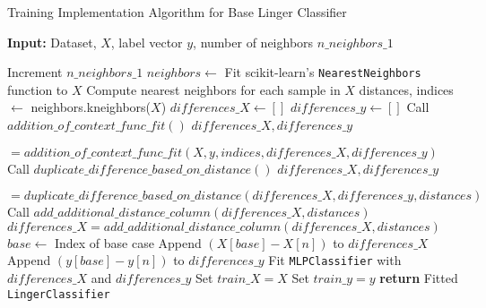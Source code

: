 \documentclass[a4paper, 12pt]{report}
\begin{document}
\begin{algorithm}[H]
    \caption{Training Implementation Algorithm for Base Linger Classifier}
    \textbf{Input:} Dataset, $X$, label vector $y$, number of neighbors $n\_neighbors\_1$
    \label{alg:base_linger_classifier_train_implementation}
    \begin{algorithmic}[1]
            \State Increment $n\_neighbors\_1$
            \State $neighbors \gets$ Fit scikit-learn's \texttt{NearestNeighbors} function to $X$
            \State Compute nearest neighbors for each sample in $X$
            \State distances, indices $\gets$ neighbors.kneighbors($X$)
            \State $differences\_X \gets []$
            \State $differences\_y \gets []$
                \State Call $addition\_of\_context\_func\_fit()$
                \State $differences\_X, differences\_y$ \par $= addition\_of\_context\_func\_fit(X, y, indices, differences\_X, differences\_y)$
                \State Call $duplicate\_difference\_based\_on\_distance()$
                \State $differences\_X, differences\_y$ \par $= duplicate\_difference\_based\_on\_distance(differences\_X, differences\_y, distances)$
                \State Call $add\_additional\_distance\_column(differences\_X, distances)$
                \State $differences\_X = add\_additional\_distance\_column(differences\_X, distances)$
            \Else
                    \State $base \gets$ Index of base case
                        \State Append $(X[base] - X[n])$ to $differences\_X$
                        \State Append $(y[base] - y[n])$ to $differences\_y$
                    \EndFor
                \EndFor  
            \EndIf
            \State Fit \texttt{MLPClassifier} with $differences\_X$ and $differences\_y$
            \State Set $train\_X = X$
            \State Set $train\_y = y$
            \State \textbf{return} Fitted \texttt{LingerClassifier}
        \EndFunction
    \end{algorithmic}
\end{algorithm}
\clearpage
\end{document}
